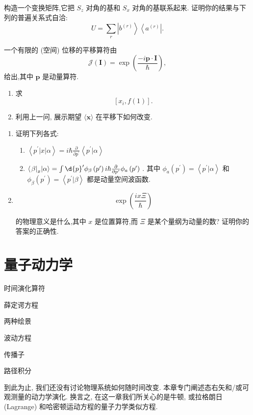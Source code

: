 \documentclass[lang=cn,newtx,10pt,scheme=chinese,thmcnt=section]{elegantbook}
\begin{document}
\begin{problemset}
\begin{enumerate}
	\end{enumerate}
	\item 构造一个变换矩阵,它把 ${S}_{z}$ 对角的基和 ${S}_{x}$ 对角的基联系起来. 证明你的结果与下列的普遍关系式自洽:
	$$
	U = \mathop{\sum }\limits_{r}\left| {b}^{\left( r\right) }\right\rangle \left\langle {a}^{\left( r\right) }\right| .
	$$
	\item 一个有限的 (空间) 位移的平移算符由
	$$
	\mathcal{J}\left( \mathbf{I}\right) = \exp \left( \frac{-i\mathbf{p} \cdot \mathbf{I}}{\hbar }\right) ,
	$$
	给出,其中 $\mathbf{p}$ 是动量算符.
	\begin{enumerate}
		\item 求
		$$
		\left\lbrack {{x}_{i}, f\left( 1\right) }\right\rbrack \text{.}
		$$
		\item 利用上一问, 展示期望 $\langle \mathbf{x}\rangle$ 在平移下如何改变.
	\end{enumerate}
	\item 
	\begin{enumerate}
		\item 证明下列各式:
		\begin{enumerate}
			\item $\left\langle {{p}^{\prime }\left| x\right| \alpha }\right\rangle = i\hbar \frac{\partial }{\partial {p}^{\prime }}\left\langle {{p}^{\prime } | \alpha }\right\rangle$
			\item $\left\langle {{\left. \beta \right| }_{x} | \alpha }\right\rangle = \int \d{p}^{\prime }{\phi }_{\beta }\left( {p}^{\prime }\right) i\hbar \frac{\partial }{\partial {p}^{\prime }}{\phi }_{a}\left( {p}^{\prime }\right)$ . 其中 ${\phi }_{a}\left( {p}^{\prime }\right) = \left\langle {{p}^{\prime } | \alpha }\right\rangle$ 和 ${\phi }_{\beta }\left( {p}^{\prime }\right) = \left\langle {{p}^{\prime } | \beta }\right\rangle$ 都是动量空间波函数.
		\end{enumerate}
		\item $$
		\exp \left( \frac{ix\Xi }{\hbar }\right)
		$$
		
		的物理意义是什么,其中 $x$ 是位置算符,而 $\Xi$ 是某个量纲为动量的数? 证明你的答案的正确性.
	\end{enumerate}
\end{problemset}

\chapter{量子动力学}
\begin{introduction}
	\item 时间演化算符
	\item 薛定谔方程
	\item 两种绘景
	\item 波动方程
	\item 传播子
	\item 路径积分
\end{introduction}
到此为止, 我们还没有讨论物理系统如何随时间改变. 本章专门阐述态右矢和/或可观测量的动力学演化. 换言之, 在这一章我们所关心的是牛顿, 或拉格朗日 (Lagrange) 和哈密顿运动方程的量子力学类似方程.
\end{document}
